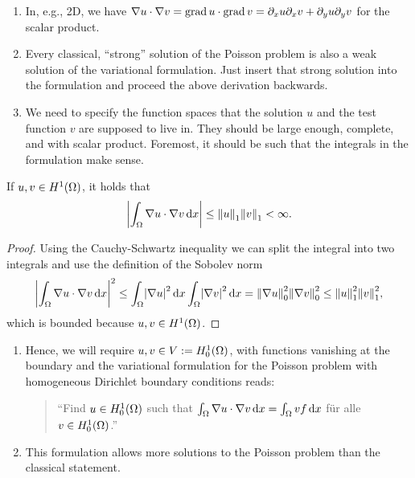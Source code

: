 \begin{remark}
	\begin{enumerate}
		\item In, e.g., 2D, we have \(\nabla u \cdot \nabla v = \operatorname{grad} u \cdot \operatorname{grad} v = \partial_x u \partial_x v + \partial_y u\partial_y v\) for the scalar product.
		\item Every classical, ``strong'' solution of the Poisson problem is also a weak solution of the variational formulation.
		Just insert that strong solution into the formulation and proceed the above derivation backwards.
		\item We need to specify the function spaces that the solution \(u\) and the test function \(v\) are supposed to live in.
		They  should be large enough, complete, and with scalar product.
		Foremost, it should be such that the integrals in the formulation make sense.
	\end{enumerate}
\end{remark}

\begin{theorem}\label{theorem:3-3}
	If \(u, v \in H^1\parentheses*{\Omega}\), it holds that
	\[
		\absolute*{\int_\Omega \nabla u \cdot \nabla v\d x} \le \norm*{u}_1 \norm*{v}_1 < \infty.
	\]
\end{theorem}

\begin{proof}
	Using the Cauchy-Schwartz inequality we can split the integral into two integrals and use the definition of the Sobolev norm
	\[
		\absolute*{\int_\Omega \nabla u \cdot \nabla v\d x}^2 \le \int_\Omega \absolute*{\nabla u}^2 \d x \int_\Omega \absolute*{\nabla v}^2 \d x = \norm*{\nabla u}_0^2 \norm*{\nabla v}_0^2 \le \norm*{u}_1^2 \norm*{v}_1^2,
	\]
	which is bounded because \(u, v \in H^1\parentheses*{\Omega}\).
\end{proof}

\begin{remark}
	\begin{enumerate}
		\item Hence, we will require \(u, v \in V := H_0^1\parentheses*{\Omega}\), with functions vanishing at the boundary and the variational formulation for the Poisson problem with homogeneous Dirichlet boundary conditions reads:
		\begin{quote}
			``Find \(u \in H_0^1\parentheses*{\Omega}\) such that \(\int_\Omega \nabla u \cdot \nabla v\mathop{\mathrm{d}\!} x = \int_\Omega vf\mathop{\mathrm{d}\!} x\) für alle \(v \in H_0^1\parentheses*{\Omega}\).'' 
		\end{quote}
		\item This formulation allows more solutions to the Poisson problem than the classical statement.
	\end{enumerate}
\end{remark}

